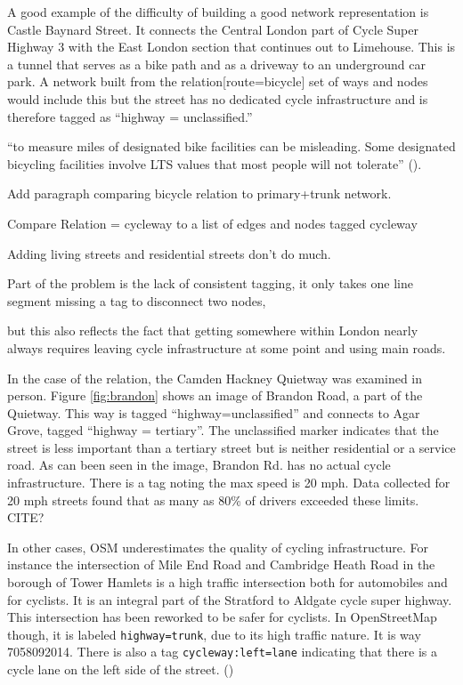 A good example of the difficulty of building a good network representation is Castle Baynard Street. It connects the Central London part of Cycle Super Highway 3 with the East London section that continues out to Limehouse. This is a tunnel that serves as a bike path and as a driveway to an underground car park. A network built from the relation[route=bicycle] set of ways and nodes would include this but the street has no dedicated cycle infrastructure and is therefore tagged as ``highway = unclassified.'' 

``to measure miles of designated bike facilities can be misleading. Some designated bicycling facilities involve LTS values that most people will not tolerate'' (\cite{furth2016network}).

Add paragraph comparing bicycle relation to primary+trunk network. 

Compare Relation = cycleway to a list of edges and nodes tagged cycleway

Adding living streets and residential streets don't do much. 

Part of the problem is the lack of consistent tagging, it only takes one line segment missing a tag to disconnect two nodes,

but this also reflects the fact that getting somewhere within London nearly always requires leaving cycle infrastructure at some point and using main roads.

In the case of the relation, the Camden Hackney Quietway was examined in person. Figure \ref{fig:brandon} shows an image of Brandon Road, a part of the Quietway. This way is tagged ``highway=unclassified'' and connects to Agar Grove, tagged ``highway = tertiary''. The unclassified marker indicates that the street is less important than a tertiary street but is neither residential or a service road. As can been seen in the image, Brandon Rd. has no actual cycle infrastructure. There is a tag noting the max speed is 20 mph. Data collected for 20 mph streets found that as many as 80\% of drivers exceeded these limits. CITE?

In other cases, OSM underestimates the quality of cycling infrastructure. For instance the intersection of Mile End Road and Cambridge Heath Road in the borough of Tower Hamlets is a high traffic intersection both for automobiles and for cyclists. It is an integral part of the Stratford to Aldgate cycle super highway. This intersection has been reworked to be safer for cyclists. In OpenStreetMap though, it is labeled \texttt{highway=trunk}, due to its high traffic nature. It is way 7058092014. There is also a tag \texttt{cycleway:left=lane} indicating that there is a cycle lane on the left side of the street. (\cite{osm})


